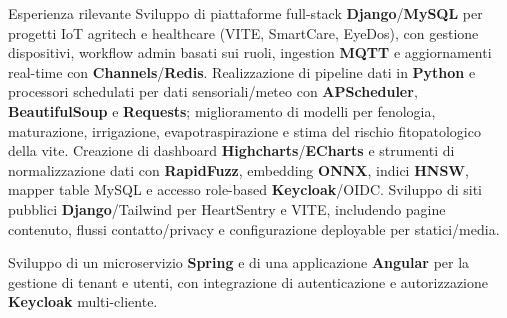 \begin{rubric}{Esperienza rilevante}
\entry*%
 Sviluppo di piattaforme full-stack \textbf{Django}/\textbf{MySQL} per progetti IoT agritech e healthcare (VITE, SmartCare, EyeDos), con gestione dispositivi, workflow admin basati sui ruoli, ingestion \textbf{MQTT} e aggiornamenti real-time con \textbf{Channels}/\textbf{Redis}.
\entry*%
 Realizzazione di pipeline dati in \textbf{Python} e processori schedulati per dati sensoriali/meteo con \textbf{APScheduler}, \textbf{BeautifulSoup} e \textbf{Requests}; miglioramento di modelli per fenologia, maturazione, irrigazione, evapotraspirazione e stima del rischio fitopatologico della vite.
\entry*%
 Creazione di dashboard \textbf{Highcharts}/\textbf{ECharts} e strumenti di normalizzazione dati con \textbf{RapidFuzz}, embedding \textbf{ONNX}, indici \textbf{HNSW}, mapper table MySQL e accesso role-based \textbf{Keycloak}/OIDC.
\entry*%
 Sviluppo di siti pubblici \textbf{Django}/Tailwind per HeartSentry e VITE, includendo pagine contenuto, flussi contatto/privacy e configurazione deployable per statici/media.

%
\entry*%
 Sviluppo di un microservizio \textbf{Spring} e di una applicazione \textbf{Angular} per la gestione di tenant e utenti, con integrazione di autenticazione e autorizzazione \textbf{Keycloak} multi-cliente.
%
\end{rubric}
